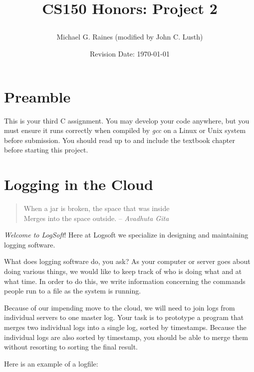 \documentclass{article}
\title{CS150 Honors: Project 2\\
\date{Revision Date: \today}}
\author{Michael G. Raines (modified by John C. Lusth)}
\begin{document}
\maketitle

\thispagestyle{empty}

\W\subsubsection*{}
\W\htmlrule

\section*{Preamble}

This is your third C assignment.  You may develop your code anywhere,
but you must ensure it runs correctly when compiled by {\it gcc}
on a Linux or Unix system
before submission.
You should read up to and include the textbook chapter
before starting this project.


\section*{Logging in the Cloud} 

\begin{quote}
When a jar is broken, the space that was inside\\
Merges into the space outside.
-- 
{\it Avadhuta Gita}
\end{quote}


{\it Welcome to LogSoft}!
Here at Logsoft we specialize in designing and maintaining logging software.

What does logging
software do, you ask?
As your computer or server goes about doing various things,
we would like to keep track of who is doing what and at what time.
In order to do this, we write 
information concerning the commands people run
to a file as the system is running.

Because of our impending move to the cloud, we will need to join 
logs from individual servers to one master log.
Your task is to prototype a program that
merges two individual logs into a single log, sorted
by timestamps. Because the individual logs are also
sorted by timestamp, you should be able to merge them
without resorting to sorting the final result.

Here is an example of a logfile:
\end{document}
